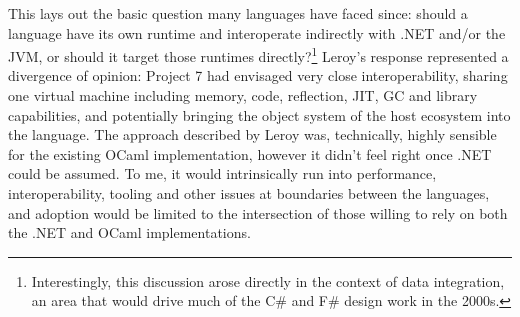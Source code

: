 \documentclass[acmsmall]{acmart}\settopmatter{}
\begin{document}
This lays out the basic question many languages have faced since: should a language have its own runtime and interoperate indirectly with .NET and/or the JVM, or
should it target those runtimes directly?\footnote{Interestingly, this discussion arose directly in the context of data integration, an area that would drive much
of the C\# and F\# design work in the 2000s.}  Leroy’s response represented a divergence of opinion: Project 7 had envisaged very close interoperability, sharing
one virtual machine including memory, code, reflection, JIT, GC and library capabilities, and potentially bringing the object system of the host ecosystem into the
language.  The approach described by Leroy was, technically, highly sensible for the existing OCaml implementation, however it didn’t feel right once .NET could be
assumed. To me, it would intrinsically run into performance, interoperability, tooling and other issues at boundaries between the languages, and adoption would be
limited to the intersection of those willing to rely on both the .NET and OCaml implementations.
\end{document}
